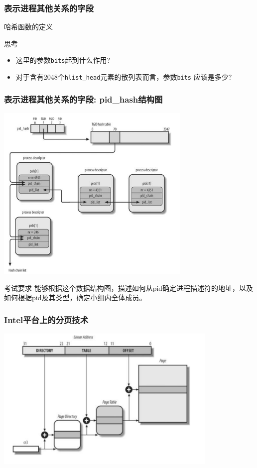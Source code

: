 \documentclass[xcolor=svgnames]{beamer}
\begin{document}
\begin{CJK*}{UTF8}{gbsn}
\begin{frame}[fragile]
\frametitle{表示进程其他关系的字段}
\begin{block}{哈希函数的定义}
\lsthashfunction
\end{block}
\begin{block}{思考}
\begin{itemize}
\item 这里的参数\verb|bits|起到什么作用? 
\item 对于含有2048个\verb|hlist_head|元素的散列表而言，参数\verb|bits|
应该是多少?
\end{itemize}
\end{block}
\end{frame}

\begin{frame}[fragile]
\frametitle{表示进程其他关系的字段: pid\_hash结构图} 
\includegraphics[width=0.7\textwidth]{pidhashes.png}
\begin{block}{考试要求}
能够根据这个数据结构图，描述如何从pid确定进程描述符的地址，以及如何根据pid及其类型，确定小组内全体成员。
\end{block}
\end{frame}

\begin{frame}[fragile]
\frametitle{Intel平台上的分页技术}
\includegraphics[width=0.8\textwidth]{regpaging.png}


\end{frame}
\end{CJK*}
\end{document}
